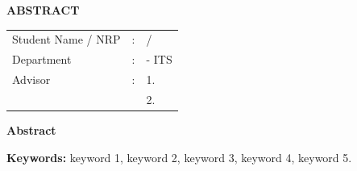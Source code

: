 \begin{center}
  \large\textbf{ABSTRACT}
\end{center}


\begin{center}
  \textbf{\engtatitle{}}
\end{center}

\vspace{1ex}

\begingroup
\setlength{\tabcolsep}{0pt}

\noindent
\begin{tabularx}{\textwidth}{l >{\centering}m{2em} X}
  Student Name / NRP & : & \name{} / \nrp{} \\
  Department         & : & \engdepartment{} \engfacultyshort{} - ITS \\
  Advisor            & : & 1. \advisor{} \\
                     &   & 2. \coadvisor{} \\
\end{tabularx}
\endgroup

\vspace{2ex}

\noindent\textbf{Abstract}

\emph{\lipsum[1]}

\vspace{2ex}

\noindent\textbf{Keywords:} keyword 1, keyword 2, keyword 3, keyword 4, keyword 5.

